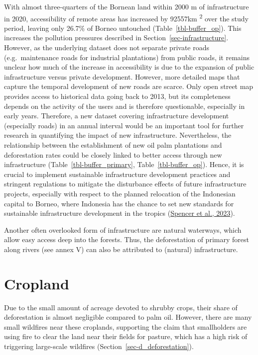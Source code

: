 \documentclass[
  letterpaper,
  DIV=11,
  numbers=noendperiod]{scrreprt}
\begin{document}
With almost three-quarters of the Bornean land within 2000 m of
infrastructure in 2020, accessibility of remote areas has increased by
92557km \textsuperscript{2} over the study period, leaving only 26.7\%
of Borneo untouched (Table~\ref{tbl-buffer_op}). This increases the
pollution pressures described in Section~\ref{sec-infrastructure}.
However, as the underlying dataset does not separate private roads
(e.g.~maintenance roads for industrial plantations) from public roads,
it remains unclear how much of the increase in accessibility is due to
the expansion of public infrastructure versus private development.
However, more detailed maps that capture the temporal development of new
roads are scarce. Only open street map provides access to historical
data going back to 2013, but its completeness depends on the activity of
the users and is therefore questionable, especially in early years.
Therefore, a new dataset covering infrastructure development (especially
roads) in an annual interval would be an important tool for further
research in quantifying the impact of new infrastructure. Nevertheless,
the relationship between the establishment of new oil palm plantations
and deforestation rates could be closely linked to better access through
new infrastructure (Table~\ref{tbl-buffer_primary},
Table~\ref{tbl-buffer_op}). Hence, it is crucial to implement
sustainable infrastructure development practices and stringent
regulations to mitigate the disturbance effects of future infrastructure
projects, especially with respect to the planned relocation of the
Indonesian capital to Borneo, where Indonesia has the chance to set new
standards for sustainable infrastructure development in the tropics
(\protect\hyperlink{ref-spencerImplicationsLargescaleInfrastructure2023}{Spencer
et al., 2023}).

Another often overlooked form of infrastructure are natural waterways,
which allow easy access deep into the forests. Thus, the deforestation
of primary forest along rivers (see annex V) can also be attributed to
(natural) infrastructure.

\hypertarget{cropland-1}{%
\section{Cropland}\label{cropland-1}}

Due to the small amount of acreage devoted to shrubby crops, their share
of deforestation is almost negligible compared to palm oil. However,
there are many small wildfires near these croplands, supporting the
claim that smallholders are using fire to clear the land near their
fields for pasture, which has a high risk of triggering large-scale
wildfires (Section~\ref{sec-d_deforestation}).
\end{document}
